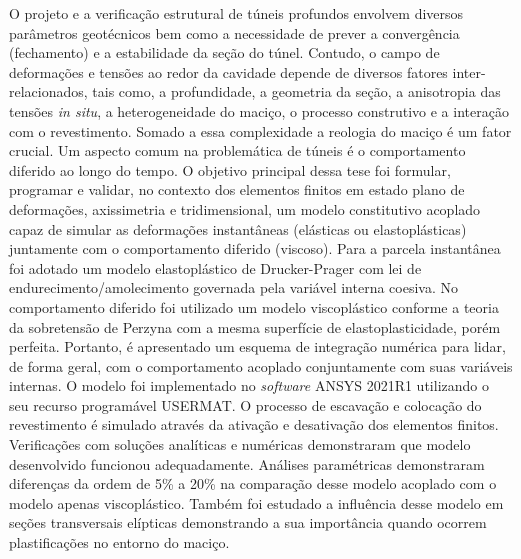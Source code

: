 O projeto e a verificação estrutural de túneis profundos envolvem diversos parâmetros geotécnicos bem como a necessidade de prever a convergência (fechamento) e a estabilidade da seção do túnel. Contudo, o campo de deformações e tensões ao redor da cavidade depende de diversos fatores inter-relacionados, tais como, a profundidade, a geometria da seção, a anisotropia das tensões \textit{in situ}, a heterogeneidade do maciço, o processo construtivo e a interação com o revestimento. Somado a essa complexidade a reologia do maciço é um fator crucial. Um aspecto comum na problemática de túneis é o comportamento diferido ao longo do tempo. O objetivo principal dessa tese foi formular, programar e validar, no contexto dos elementos finitos em estado plano de deformações, axissimetria e tridimensional, um modelo constitutivo acoplado capaz de simular as deformações instantâneas (elásticas ou elastoplásticas) juntamente com o comportamento diferido (viscoso). Para a parcela instantânea foi adotado um modelo elastoplástico de Drucker-Prager com lei de endurecimento/amolecimento governada pela variável interna coesiva. No comportamento diferido foi utilizado um modelo viscoplástico conforme a teoria da sobretensão de Perzyna com a mesma superfície de elastoplasticidade, porém perfeita. Portanto, é apresentado um esquema de integração numérica para lidar, de forma geral, com o comportamento acoplado conjuntamente com suas variáveis internas. O modelo foi implementado no \textit{software} ANSYS 2021R1 utilizando o seu recurso programável USERMAT. O processo de escavação e colocação do revestimento é simulado através da ativação e desativação dos elementos finitos. Verificações com soluções analíticas e numéricas demonstraram que modelo desenvolvido funcionou adequadamente. Análises paramétricas demonstraram diferenças da ordem de 5\% a 20\% na comparação desse modelo acoplado com o modelo apenas viscoplástico. Também foi estudado a influência desse modelo em seções transversais elípticas demonstrando a sua importância quando ocorrem plastificações no entorno do maciço.
